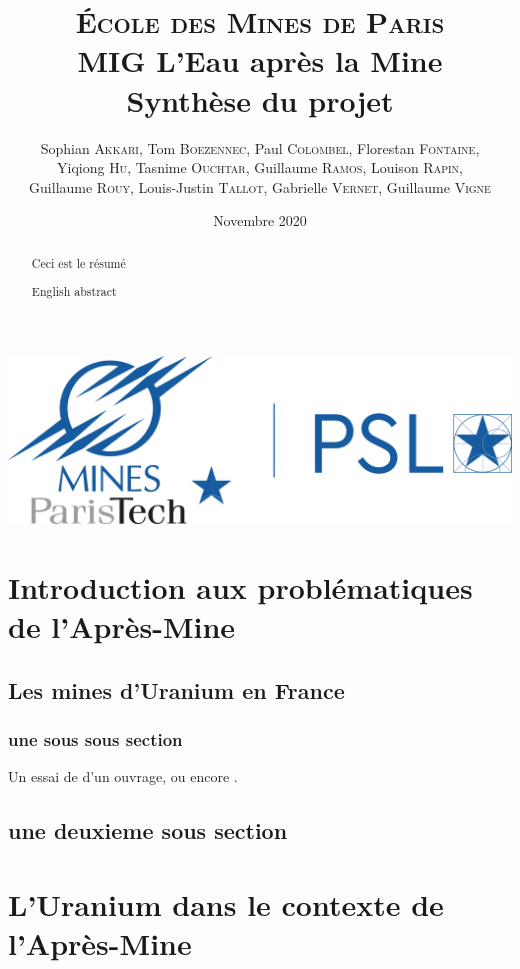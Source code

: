 \documentclass{article}
\title{\textbf{\LARGE{\textsc{École des Mines de Paris}}\\ \vspace{1 cm}MIG L'Eau après la Mine\\\vspace{0.8 cm}Synthèse du projet}\vspace{1 cm}}
\author{Sophian \textsc{Akkari}, Tom \textsc{Boezennec}, Paul \textsc{Colombel}, Florestan \textsc{Fontaine},\\ Yiqiong \textsc{Hu}, Tasnime \textsc{Ouchtar}, Guillaume \textsc{Ramos}, Louison \textsc{Rapin},\\ Guillaume \textsc{Rouy},  Louis-Justin \textsc{Tallot}, Gabrielle \textsc{Vernet}, Guillaume \textsc{Vigne}\\ }
\date{\vspace{1 cm}Novembre 2020}
\begin{document}

\maketitle
\thispagestyle{empty}
\vspace{5 cm}
\begin{center}
    \includegraphics[width = 0.4\linewidth]{logoMPT.png}
\end{center}


\newpage
{}
\tableofcontents

\newpage

\begin{abstract}
    Ceci est le résumé
\end{abstract}


{
\begin{abstract}
    English abstract
\end{abstract}
}

\newpage
{}
\section{Introduction aux problématiques de l'Après-Mine}
\subsection{Les mines d'Uranium en France}
\subsubsection{une sous sous section}
\blindtext

Un essai de \cite{einstein} d'un ouvrage, ou encore \cite{dirac}. 
\newpage
\subsection{une deuxieme sous section}
\blindtext
\blindtext
\blindtext


\newpage
\section{L'Uranium dans le contexte de l'Après-Mine}
\end{document}
